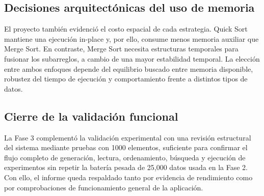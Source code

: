 \subsection*{Decisiones arquitectónicas del uso de memoria}
\vspace{0.3cm}
\par \noindent El proyecto también evidenció el costo espacial de cada estrategia. Quick Sort mantiene una ejecución in-place y, por ello, consume menos memoria auxiliar que Merge Sort. En contraste, Merge Sort necesita estructuras temporales para fusionar los subarreglos, a cambio de una mayor estabilidad temporal. La elección entre ambos enfoques depende del equilibrio buscado entre memoria disponible, robustez del tiempo de ejecución y comportamiento frente a distintos tipos de datos.

\subsection*{Cierre de la validación funcional}
\vspace{0.3cm}
\par \noindent La Fase 3 complementó la validación experimental con una revisión estructural del sistema mediante pruebas con 1000 elementos, suficiente para confirmar el flujo completo de generación, lectura, ordenamiento, búsqueda y ejecución de experimentos sin repetir la batería pesada de 25,000 datos usada en la Fase 2. Con ello, el informe queda respaldado tanto por evidencia de rendimiento como por comprobaciones de funcionamiento general de la aplicación.
